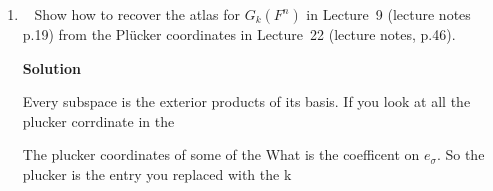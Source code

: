 \documentclass[11pt]{article}
\newcommand\score[1]{\marginpar{\vspace{-2ex}\color{blue}{#1/3}}\hspace{-1ex}}
\newcommand\0{\mathbf{0}}
\newcommand\<{\langle}
\renewcommand\>{\rangle}
\begin{document}
\begin{enumerate}
\textbf{Solution}

Define $\wedge_{[\perp]}(\sigma_{r},\sigma_{s})=[\sigma_{r} \perp \sigma_{s}](-1)^{inv(\sigma_{r},\sigma_{s})mod 2} \sigma_{r}\wedge \sigma_{s}$.
This function evalues to zero if the two inputs are dependent(in this case it checks if there are two of the same basis vectors using the Iverson bracket), it also accounts for 
the sign of the parity of the ordering.

Define $f$ as $(v^{r},v^{s}) \mapsto ((a_{1}\sigma^{r}_{1})+\cdots+(a_{\binom{[n]}{r}} \sigma^{r}_{\binom{[n]}{r}})) \wedge_{[\perp]} ((a_{1}\sigma^{s}_{1})+\cdots+(a_{\binom{[n]}{s}} \sigma^{r}_{\binom{[n]}{s}}))$, where $n$ is the dimension of $V$.

$f$ is bilinear since the the wedge itself is a bilinear operator.

$\omega' \wedge \omega = (-1)^{rs} \omega \wedge \omega'$ because $rs$ is the total change in the number of inversions, 
and since we only care about the parity, $x-y\equiv x+y$ therefore we only need to care about the aboslute value of inversions that were both 
created and destroyed, this value is $rs$ because for every vector in $\omega$ it has swapped orientation with every vector in $\omega^{'}$, therefore there are 
a total of $rs$ changes in orientaiton.

\item\ \score{0}%
Show how to recover the atlas for $G_k(F^n)$ in Lecture~9 (lecture
notes p.19) from the Pl\"ucker coordinates in Lecture~22 (lecture
notes, p.46).

\textbf{Solution}

Every subspace is the exterior products of its basis.
If you look at all the plucker corrdinate in the

The plucker coordinates of some of the 
What is the coefficent on $e_{\sigma}$. So the plucker is the entry you 
replaced with the k

\end{enumerate}


\end{document}
